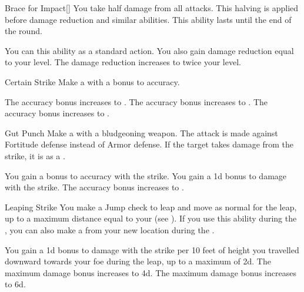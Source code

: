         {
            \begin{ability}{Brace for Impact}[]
                You take half damage from all attacks.
                This halving is applied before damage reduction and similar abilities.
                This ability lasts until the end of the round.

                \rankline
                 You can  this ability as a standard action.
                 You also gain damage reduction equal to your level.
                 The damage reduction increases to twice your level.
            \end{ability}

            \begin{ability}{Certain Strike}
                Make a  with a  bonus to accuracy.

                \rankline
                 The accuracy bonus increases to .
                 The accuracy bonus increases to .
                 The accuracy bonus increases to .
            \end{ability}

            \begin{ability}{Gut Punch}
                Make a  with a bludgeoning weapon.
                The attack is made against Fortitude defense instead of Armor defense.
                If the target takes damage from the strike, it is \sickened as a .

                \rankline
                 You gain a  bonus to accuracy with the strike.
                 You gain a \plus1d bonus to damage with the strike.
                 The accuracy bonus increases to .
            \end{ability}

            \begin{ability}{Leaping Strike}
                You make a Jump check to leap and move as normal for the leap, up to a maximum distance equal to your  (see ).
                If you use this ability during the , you can also make a  from your new location during the .

                \rankline
                 You gain a \plus1d bonus to damage with the strike per 10 feet of height you travelled downward towards your foe during the leap, up to a maximum of \plus2d.
                 The maximum damage bonus increases to \plus4d.
                 The maximum damage bonus increases to \plus6d.
            \end{ability}

}
